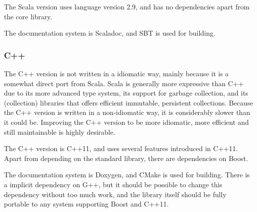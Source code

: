 The Scala version uses language version 2.9,
and has no dependencies apart from the core library.

The documentation system is Scaladoc, and SBT is used
for building.

\subsubsection{C++}

The C++ version is not written in a idiomatic way,
mainly because it is a somewhat direct port from Scala.
Scala is generally more expressive than C++ due to its more advanced type system,
its support for garbage collection, and its (collection) libraries
that offers efficient immutable, persistent collections.
Because the C++ version is written in a non-idiomatic way,
it is considerably slower than it could be.
Improving the C++ version to be more idiomatic, more efficient
and still maintainable is highly desirable.

The C++ version is C++11, and uses several features introduced
in C++11. Apart from depending on the standard library, there
are dependencies on Boost.

The documentation system is Doxygen, and CMake is used for building.
There is a implicit dependency on G++, but it should be possible
to change this dependency without too much work, and the library
itself should be fully portable to any system supporting Boost
and C++11.

